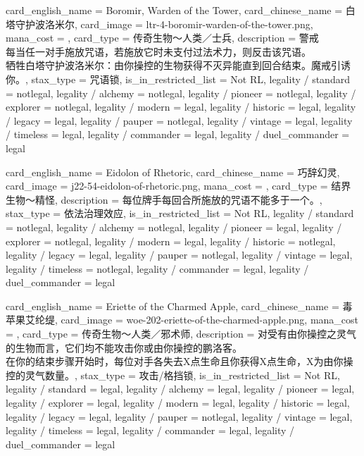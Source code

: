 \documentclass[lang = cn, color = black, 10pt]{AllThatStax}
\begin{document}
\card
{
	card_english_name = {Boromir, Warden of the Tower},
	card_chinese_name = {白塔守护波洛米尔},
	card_image = ltr-4-boromir-warden-of-the-tower.png,
	mana_cost = ,
	card_type = 传奇生物～人类／士兵,
	description = {警戒\\
每当任一对手施放咒语，若施放它时未支付过法术力，则反击该咒语。\\
牺牲白塔守护波洛米尔：由你操控的生物获得不灭异能直到回合结束。魔戒引诱你。},
	stax_type = 咒语锁,
	is_in_restricted_list = Not RL,
	legality / standard = notlegal,
	legality / alchemy = notlegal,
	legality / pioneer = notlegal,
	legality / explorer = notlegal,
	legality / modern = legal,
	legality / historic = legal,
	legality / legacy = legal,
	legality / pauper = notlegal,
	legality / vintage = legal,
	legality / timeless = legal,
	legality / commander = legal,
	legality / duel_commander = legal
}

\card
{
	card_english_name = {Eidolon of Rhetoric},
	card_chinese_name = {巧辞幻灵},
	card_image = j22-54-eidolon-of-rhetoric.png,
	mana_cost = ,
	card_type = 结界生物～精怪,
	description = {每位牌手每回合所施放的咒语不能多于一个。},
	stax_type = 依法治理效应,
	is_in_restricted_list = Not RL,
	legality / standard = notlegal,
	legality / alchemy = notlegal,
	legality / pioneer = legal,
	legality / explorer = notlegal,
	legality / modern = legal,
	legality / historic = notlegal,
	legality / legacy = legal,
	legality / pauper = notlegal,
	legality / vintage = legal,
	legality / timeless = notlegal,
	legality / commander = legal,
	legality / duel_commander = legal
}

\card
{
	card_english_name = {Eriette of the Charmed Apple},
	card_chinese_name = {毒苹果艾纶缇},
	card_image = woe-202-eriette-of-the-charmed-apple.png,
	mana_cost = ,
	card_type = 传奇生物～人类／邪术师,
	description = {对受有由你操控之灵气的生物而言，它们均不能攻击你或由你操控的鹏洛客。\\
在你的结束步骤开始时，每位对手各失去X点生命且你获得X点生命，X为由你操控的灵气数量。},
	stax_type = 攻击/格挡锁,
	is_in_restricted_list = Not RL,
	legality / standard = legal,
	legality / alchemy = legal,
	legality / pioneer = legal,
	legality / explorer = legal,
	legality / modern = legal,
	legality / historic = legal,
	legality / legacy = legal,
	legality / pauper = notlegal,
	legality / vintage = legal,
	legality / timeless = legal,
	legality / commander = legal,
	legality / duel_commander = legal
}
\end{document}
